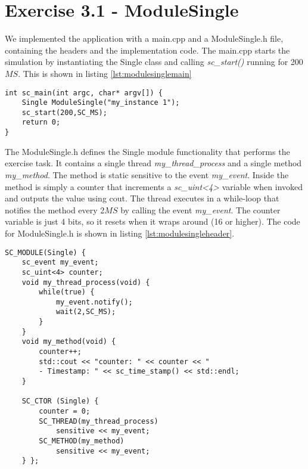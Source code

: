 \section{Exercise 3.1 - ModuleSingle}

We implemented the application with a main.cpp and a ModuleSingle.h file, containing the headers and the implementation code. The main.cpp starts the simulation by instantiating the Single class and calling \textit{sc\_start()} running for 200$MS$. This is shown in listing \ref{lst:modulesinglemain}

\begin{lstlisting}[style=customc++, caption=Application file for ModuleSingle,
label={lst:modulesinglemain}]
int sc_main(int argc, char* argv[]) {
	Single ModuleSingle("my_instance 1");
	sc_start(200,SC_MS);
	return 0;
}
\end{lstlisting}

\noindent The ModuleSingle.h defines the Single module functionality that performs the exercise task. It contains a single thread \textit{my\_thread\_process} and a single method \textit{my\_method}. The method is static sensitive to the event \textit{my\_event}. Inside the method is simply a counter that increments a \textit{sc\_uint<4>} variable when invoked and outputs the value using cout. The thread executes in a while-loop that notifies the method every 2$MS$ by calling the event \textit{my\_event}. The counter variable is just 4 bits, so it resets when it wraps around (16 or higher). The code for ModuleSingle.h is shown in listing \ref{lst:modulesingleheader}.

\begin{lstlisting}[style=customc++, caption=Implementation of ModuleSingle,
label={lst:modulesingleheader}]
SC_MODULE(Single) {
	sc_event my_event;
	sc_uint<4> counter;
	void my_thread_process(void) {
		while(true) {
			my_event.notify();
			wait(2,SC_MS);
		}
	}
	void my_method(void) {
		counter++;
		std::cout << "counter: " << counter << "
		- Timestamp: " << sc_time_stamp() << std::endl;
	}
	
	SC_CTOR (Single) {
		counter = 0;
		SC_THREAD(my_thread_process)
			sensitive << my_event;
		SC_METHOD(my_method)
			sensitive << my_event;
	} };
\end{lstlisting}